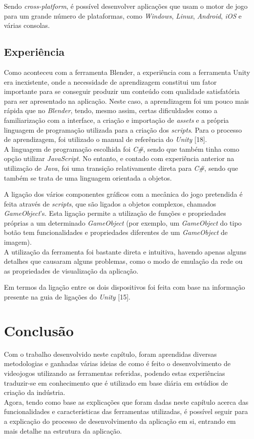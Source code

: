 Sendo \textit{cross-platform}, é possível desenvolver aplicações que usam o motor de jogo para um grande número de plataformas, como \emph{Windows}, \emph{Linux}, \emph{Android}, \emph{iOS} e várias consolas.


\subsection{Experiência}
\label{chap3:subsec:experienciaU}
Como aconteceu com a ferramenta Blender, a experiência com a ferramenta Unity era inexistente, onde a necessidade de aprendizagem constitui um fator importante para se conseguir produzir um conteúdo com qualidade satisfatória para ser apresentado na aplicação. Neste caso, a aprendizagem foi um pouco mais rápida que no \emph{Blender}, tendo, mesmo assim, certas dificuldades como a familiarização com a interface, a criação e importação de \textit{assets} e a própria linguagem de programação utilizada para a criação dos \textit{scripts}. Para o processo de aprendizagem, foi utilizado o manual de referência do \emph{Unity} [18]. \\ 

A linguagem de programação escolhida foi \emph{C\#}, sendo que também tinha como opção utilizar \emph{JavaScript}. No entanto, e contado com experiência anterior na utilização de \emph{Java}, foi uma transição relativamente direta para \emph{C\#}, sendo que também se trata de uma linguagem orientada a objetos.

A ligação dos vários componentes gráficos com a mecânica do jogo pretendida é feita através de \textit{scripts}, que são ligados a objetos complexos, chamados \emph{GameObject}'s. Esta ligação permite a utilização de funções e propriedades próprias a um determinado \emph{GameObject} (por exemplo, um \emph{GameObject} do tipo botão tem funcionalidades e propriedades diferentes de um \emph{GameObject} de imagem). \\ 

A utilização da ferramenta foi bastante direta e intuitiva, havendo apenas alguns detalhes que causaram alguns problemas, como o modo de emulação da rede ou as propriedades de visualização da aplicação.

Em termos da ligação entre os dois dispositivos foi feita com base na informação presente na guia de ligações do \emph{Unity} [15].

\section{Conclusão}
\label{chap3:sec:conc}
Com o trabalho desenvolvido neste capítulo, foram aprendidas diversas metodologias e ganhadas várias ideias de como é feito o desenvolvimento de videojogos utilizando as ferramentas referidas, podendo estas experiências traduzir-se em conhecimento que é utilizado em base diária em estúdios de criação da indústria. \\ 
Agora, tendo como base as explicações que foram dadas neste capítulo acerca das funcionalidades e características das ferramentas utilizadas, é possível seguir para a explicação do processo de desenvolvimento da aplicação em si, entrando em mais detalhe na estrutura da aplicação.